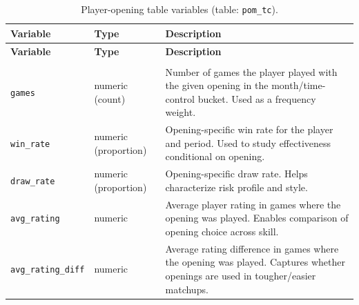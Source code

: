 \documentclass[
  12pt]{article}
\newcommand{\us}{\_\allowbreak}
\begin{document}
\begin{xltabular}{\textwidth}{>{\raggedright\arraybackslash}p{3.2cm} >{\raggedright\arraybackslash}p{2.6cm} X}
\caption{Player-opening table variables (table: \texttt{pom\us tc}).}\label{tab:variables-player-opening}\\
\toprule
\textbf{Variable} & \textbf{Type} & \textbf{Description} \\
\midrule
\endfirsthead

\toprule
\textbf{Variable} & \textbf{Type} & \textbf{Description} \\
\midrule
\endhead

\midrule
{} \\
\endfoot

\bottomrule
\endlastfoot

\texttt{games} & numeric (count) & Number of games the player played with the given opening in the month/time-control bucket. Used as a frequency weight. \\
\texttt{win\us rate} & numeric (proportion) & Opening-specific win rate for the player and period. Used to study effectiveness conditional on opening. \\
\texttt{draw\us rate} & numeric (proportion) & Opening-specific draw rate. Helps characterize risk profile and style. \\
\texttt{avg\us rating} & numeric & Average player rating in games where the opening was played. Enables comparison of opening choice across skill. \\
\texttt{avg\us rating\us diff} & numeric & Average rating difference in games where the opening was played. Captures whether openings are used in tougher/easier matchups. \\
\end{xltabular}
\end{document}
